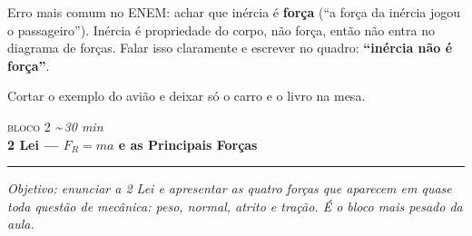 \documentclass[11pt,a4paper]{article}
\newcommand{\bloco}[3]{%
  \needspace{7\baselineskip}
  \vspace{1.8em}
  {\scshape\color{vinho}bloco #1}\hfill
    {\small\itshape\color{grafite}\textasciitilde\,#3 min}\\[0.1em]
  {\Large\bfseries #2}\\[-0.55em]
  {\color{black!30}\rule{\linewidth}{0.5pt}}
  \par\nobreak\smallskip
}
\newcommand{\objetivo}[1]{{\itshape\color{grafite}Objetivo: #1}\par\smallskip}
\begin{document}
\begin{obs}
Erro mais comum no ENEM: achar que in\'ercia \'e \textbf{for\c{c}a}
(``a for\c{c}a da in\'ercia jogou o passageiro''). In\'ercia \'e
propriedade do corpo, n\~ao for\c{c}a, ent\~ao n\~ao entra no diagrama
de for\c{c}as. Falar isso claramente e escrever no quadro:
\textbf{``in\'ercia n\~ao \'e for\c{c}a''}.
\end{obs}

\begin{corte}
Cortar o exemplo do avi\~ao e deixar s\'o o carro e o livro na mesa.
\end{corte}

\bloco{2}{2\textordfeminine{} Lei --- $F_R = ma$ e as Principais For\c{c}as}{30}

\objetivo{enunciar a 2\textordfeminine{} Lei e apresentar as quatro
for\c{c}as que aparecem em quase toda quest\~ao de mec\^anica: peso,
normal, atrito e tra\c{c}\~ao. \'E o bloco mais pesado da aula.}
\end{document}
